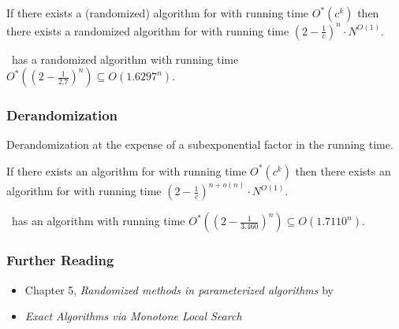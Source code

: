 \begin{frame}[c]
   
    \begin{theorem}
        If there exists a (randomized) algorithm for \phiext with running time $O^*(c^k)$ then there exists a randomized algorithm for \phisub with running time $(2 - \frac{1}{c})^n \cdot N^{O(1)}$.
    \end{theorem} 
    \pause
    \begin{theorem}
        \FVS\ has a randomized algorithm with running time $O^*\left(\left( 2 - \frac{1}{2.7}\right)^n\right) \subseteq O(1.6297^n)$.
    \end{theorem}


\end{frame}

\begin{frame}[c]\frametitle{Derandomization}

Derandomization at the expense of a subexponential factor in the running time.
\begin{theorem}
	If there exists an algorithm for \phiext with running time $O^*(c^k)$ then there exists an algorithm for \phisub with running time $(2 - \frac{1}{c})^{n+o(n)} \cdot N^{O(1)}$.
\end{theorem} 
\pause
\begin{theorem}
	\FVS\ has an algorithm with running time $O^*\left(\left( 2 - \frac{1}{3.460}\right)^n\right) \subseteq O(1.7110^n)$.
\end{theorem}

\end{frame}



\begin{frame}[c]\frametitle{Further Reading}
    \begin{itemize}
   
    \item Chapter 5, \emph{Randomized methods in parameterized algorithms} by \cite{CyganFKL+15}
    \item \emph{Exact Algorithms via Monotone Local Search} \cite{FominGLS19}
  \end{itemize}
\end{frame}

\begin{frame}[t, allowframebreaks]
	\printbibliography
\end{frame}





